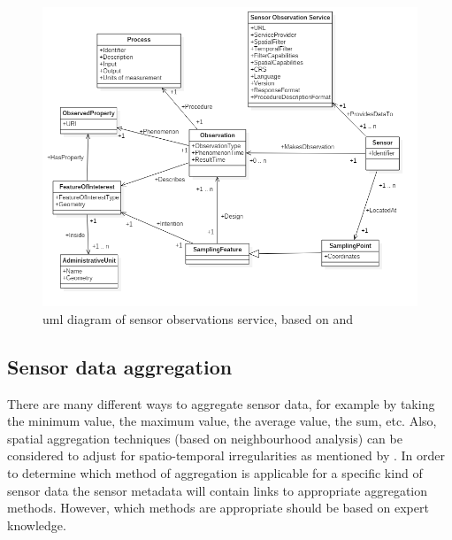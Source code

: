 \begin{figure}
	\centering
	\includegraphics[width=1\linewidth]{figs/UML_Diagram.png}
	\caption{\ac{uml} diagram of sensor observations service, based on \cite{SSW:Cox3} and \cite{SDI:INSPIRE2}}
	\label{fig:UML}
\end{figure}

\subsection{Sensor data aggregation}
There are many different ways to aggregate sensor data, for example by taking the minimum value, the maximum value, the average value, the sum, etc. Also, spatial aggregation techniques (based on neighbourhood analysis) can be considered to adjust for spatio-temporal irregularities as mentioned by \cite{SW:Ganesan}. In order to determine which method of aggregation is applicable for a specific kind of sensor data the sensor metadata will contain links to appropriate aggregation methods. However, which methods are appropriate should be based on expert knowledge.

